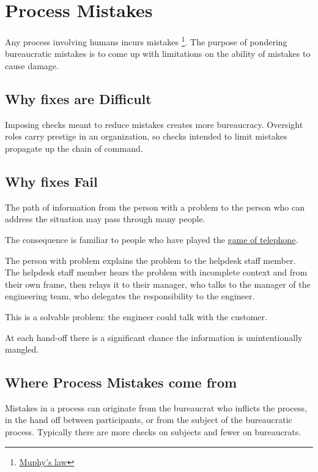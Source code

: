 \section{Process Mistakes\label{sec:process-mistakes}}

Any process involving humans incurs mistakes  
\footnote{\href{https://en.wikipedia.org/wiki/Murphy\%27s_law}{Muphy's law}
}. 
The purpose of pondering bureaucratic mistakes is to come up with limitations on the ability of mistakes to cause damage. 

\subsection*{Why fixes are Difficult}
Imposing checks meant to reduce mistakes creates more bureaucracy. Oversight roles carry prestige in an organization, so checks intended to limit mistakes propagate up the chain of command.


\subsection*{Why fixes Fail}
The path of information from the person with a problem to the person who can address the situation may pass through many people. 

The consequence is familiar to people who have played the \href{https://en.wikipedia.org/wiki/Chinese_whispers\%23Game}{game of telephone}.
\begin{mdframed}
The person with problem explains the problem to the helpdesk staff member. The helpdesk staff member hears the problem with incomplete context and from their own frame, then relays it to their manager, who talks to the manager of the engineering team, who delegates the responsibility to the engineer. 
\end{mdframed}
This is a solvable problem: the engineer could talk with the customer. 

At each hand-off there is a significant chance the information is unintentionally mangled. 

\subsection*{Where Process Mistakes come from}
Mistakes in a process can originate from the bureaucrat who inflicts the process, in the hand off between participants, or from the \gls{subject} of the bureaucratic process. Typically there are more checks on subjects and fewer on bureaucrats. 

